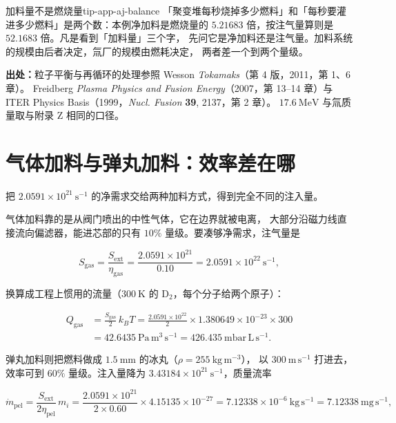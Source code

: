 \begin{tip}{加料量不是燃烧量}{tip-app-aj-balance}
「聚变堆每秒烧掉多少燃料」和「每秒要灌进多少燃料」是两个数：本例净加料是燃烧量的
$5.21683$ 倍，按注气量算则是 $52.1683$ 倍。凡是看到「加料量」三个字，
先问它是净加料还是注气量。加料系统的规模由后者决定，氚厂的规模由燃耗决定，
两者差一个到两个量级。
\end{tip}

{\footnotesize
\textbf{出处：}粒子平衡与再循环的处理参照 Wesson \emph{Tokamaks}（第 4 版，2011，第 1、6 章）。
Freidberg \emph{Plasma Physics and Fusion Energy}（2007，第 13--14 章）与
ITER Physics Basis（1999，\emph{Nucl. Fusion} \textbf{39}, 2137，第 2 章）。
$17.6\ \mathrm{MeV}$ 与氚质量取与附录 Z 相同的口径。
}

\section{气体加料与弹丸加料：效率差在哪}
\label{sec:app-aj-fuelling}

把 $2.0591\times10^{21}\ \mathrm{s^{-1}}$ 的净需求交给两种加料方式，得到完全不同的注入量。

气体加料靠的是从阀门喷出的中性气体，它在边界就被电离，
大部分沿磁力线直接流向偏滤器，能进芯部的只有 $10\%$ 量级。要凑够净需求，注气量是

\begin{equation}
S_{\mathrm{gas}} = \frac{S_{\mathrm{ext}}}{\eta_{\mathrm{gas}}}
= \frac{2.0591\times10^{21}}{0.10} = 2.0591\times10^{22}\ \mathrm{s^{-1}},
\label{eq:app-aj-gasinj}
\end{equation}

换算成工程上惯用的流量（$300\ \mathrm{K}$ 的 $\mathrm{D_2}$，每个分子给两个原子）：

\begin{equation}
\begin{aligned}
Q_{\mathrm{gas}} &= \frac{S_{\mathrm{gas}}}{2}\,k_BT
= \frac{2.0591\times10^{22}}{2}\times1.380649\times10^{-23}\times300 \\
&= 42.6435\ \mathrm{Pa\,m^{3}\,s^{-1}} = 426.435\ \mathrm{mbar\,L\,s^{-1}}.
\end{aligned}
\label{eq:app-aj-gasflow}
\end{equation}

弹丸加料则把燃料做成 $1.5\ \mathrm{mm}$ 的冰丸（$\rho = 255\ \mathrm{kg\,m^{-3}}$），
以 $300\ \mathrm{m\,s^{-1}}$ 打进去，效率可到 $60\%$ 量级。注入量降为
$3.43184\times10^{21}\ \mathrm{s^{-1}}$，质量流率

\begin{equation}
\dot m_{\mathrm{pel}} = \frac{S_{\mathrm{ext}}}{2\eta_{\mathrm{pel}}}\,m_i
= \frac{2.0591\times10^{21}}{2\times0.60}\times4.15135\times10^{-27}
= 7.12338\times10^{-6}\ \mathrm{kg\,s^{-1}} = 7.12338\ \mathrm{mg\,s^{-1}},
\label{eq:app-aj-pelletmass}
\end{equation}

